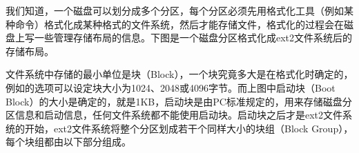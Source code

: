 我们知道，一个磁盘可以划分成多个分区，每个分区必须先用格式化工具（例如某种命令）格式化成某种格式的文件系统，然后才能存储文件，格式化的过程会在磁盘上写一些管理存储布局的信息。下图是一个磁盘分区格式化成ext2文件系统后的存储布局。




文件系统中存储的最小单位是块（Block），一个块究竟多大是在格式化时确定的，例如的选项可以设定块大小为1024、2048或4096字节。而上图中启动块（Boot Block）的大小是确定的，就是1KB，启动块是由PC标准规定的，用来存储磁盘分区信息和启动信息，任何文件系统都不能使用启动块。启动块之后才是ext2文件系统的开始，ext2文件系统将整个分区划成若干个同样大小的块组（Block Group），每个块组都由以下部分组成。


